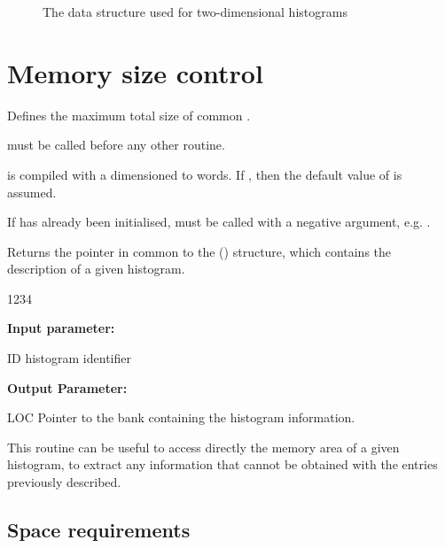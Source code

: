 \begin{figure}[p]
\caption[The ZEBRA data structure used for two-dimensional histograms]%
        {The \ZEBRA{} data structure used for two-dimensional histograms}
\label{FZEBRA}
\begin{center}
\mbox{}
\end{center}
\end{figure}

\section{Memory size control}
\label{HMEMORYS}
 
 
\Action
Defines the maximum total size   of common
.
 
\Remark
\begin{UL}
\item {} must be called before any other \HBOOK{}
routine.
\item \HBOOK{} is compiled with a  dimensioned to  words.
If , then the default value of  is assumed.
\item If \ZEBRA{} has already been initialised,  must be called
with a negative argument, e.g. .
\end{UL}

 
\Action
Returns the pointer in common
to the \ZEBRA{} (\cite{bib-ZEBRA}) structure,
which contains the description of a given histogram.
\begin{DLtt}{1234}
\item[{\rm\bf Input parameter:}]
\item[ID] histogram identifier
\item[{\rm\bf Output Parameter:}]
\item[LOC] Pointer to the \ZEBRA{} bank containing the histogram information.
\end{DLtt}
This routine can be useful to access directly the memory area
of a given histogram,
to extract any information that cannot be obtained with the entries
previously described.

\subsection{Space requirements}

